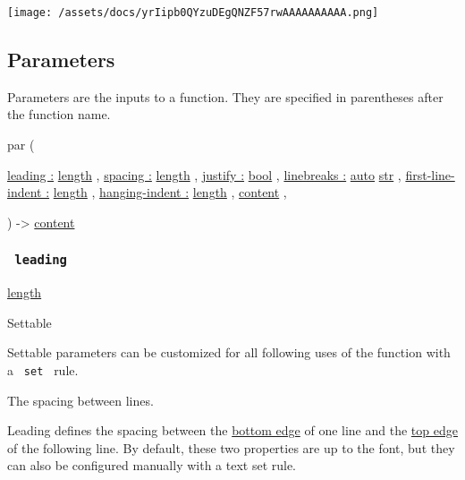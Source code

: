 \texttt{[image: /assets/docs/yrIipb0QYzuDEgQNZF57rwAAAAAAAAAA.png]}

\subsection{\texorpdfstring{{ Parameters
}}{ Parameters }}\label{parameters}

\label{parameters-tooltip}
Parameters are the inputs to a function. They are specified in
parentheses after the function name.

{ par } (

{ \hyperref[parameters-leading]{leading :}
\href{/docs/reference/layout/length/}{length} , } {
\hyperref[parameters-spacing]{spacing :}
\href{/docs/reference/layout/length/}{length} , } {
\hyperref[parameters-justify]{justify :}
\href{/docs/reference/foundations/bool/}{bool} , } {
\hyperref[parameters-linebreaks]{linebreaks :}
\href{/docs/reference/foundations/auto/}{auto}
\href{/docs/reference/foundations/str/}{str} , } {
\hyperref[parameters-first-line-indent]{first-line-indent :}
\href{/docs/reference/layout/length/}{length} , } {
\hyperref[parameters-hanging-indent]{hanging-indent :}
\href{/docs/reference/layout/length/}{length} , } {
\href{/docs/reference/foundations/content/}{content} , }

) -\textgreater{} \href{/docs/reference/foundations/content/}{content}

\subsubsection{\texorpdfstring{\texttt{\ leading\ }}{ leading }}\label{parameters-leading}

\href{/docs/reference/layout/length/}{length}

{{ Settable }}

\label{parameters-leading-settable-tooltip}
Settable parameters can be customized for all following uses of the
function with a \texttt{\ set\ } rule.

The spacing between lines.

Leading defines the spacing between the
\href{/docs/reference/text/text/\#parameters-bottom-edge}{bottom edge}
of one line and the
\href{/docs/reference/text/text/\#parameters-top-edge}{top edge} of the
following line. By default, these two properties are up to the font, but
they can also be configured manually with a text set rule.

